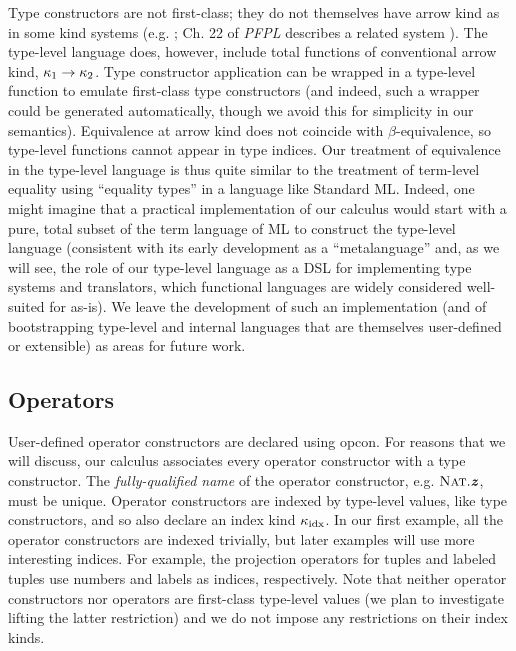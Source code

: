 \documentclass[9pt,preprint]{sigplanconf}
\begin{document}
Type constructors are not first-class; they do not themselves have arrow kind as in some kind systems (e.g.  \cite{Watkins08}; Ch. 22 of \emph{PFPL} describes a related system \cite{pfpl}). The type-level language does, however, include total functions of conventional arrow kind, $\kappa_1\rightarrow{\kappa_2}$. Type constructor application can be wrapped in a type-level function to emulate first-class type constructors (and indeed, such a wrapper could be generated automatically, though we avoid this for simplicity in our semantics). Equivalence at arrow kind does not coincide with $\beta$-equivalence, so type-level functions cannot appear in type indices. Our treatment of equivalence in the type-level language is thus quite similar to the treatment of term-level equality using ``equality types'' in a language like Standard ML. Indeed, one might imagine that a practical implementation of our calculus would start with a pure, total subset of the term language of ML to construct the type-level language (consistent with its early development as a ``metalanguage'' and, as we will see, the role of our type-level language as a DSL for implementing type systems and translators, which functional languages are widely considered well-suited for as-is). We leave the development of such an implementation (and of bootstrapping type-level and internal languages that are themselves user-defined or extensible) as areas for future work.
\subsection{Operators}
User-defined operator constructors are declared using \textsf{opcon}. For reasons that we will discuss, our calculus associates every operator constructor with a type constructor. The \emph{fully-qualified name} of the operator constructor, e.g. $\textsc{Nat}.\textbf{\textit{z}}$, must be unique. Operator constructors are indexed by type-level values, like type constructors, and so also declare an index kind $\kappa_{\text{idx}}$. In our first example, all the operator constructors are indexed trivially, but later examples will use more interesting indices. For example, the projection operators for tuples and labeled tuples use numbers and labels as indices, respectively.
Note that neither operator constructors nor operators are first-class type-level values (we plan to investigate  lifting the latter restriction) and we do not impose any restrictions on their index kinds.
\end{document}
